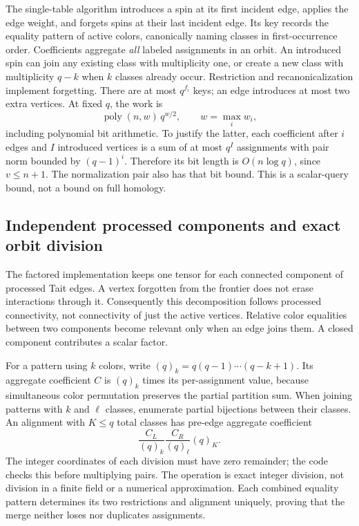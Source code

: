 The single-table algorithm introduces a spin at its first incident edge,
applies the edge weight, and forgets spins at their last incident edge.
Its key records the equality pattern of active colors, canonically naming
classes in first-occurrence order. Coefficients aggregate \emph{all} labeled
assignments in an orbit. An introduced spin can join any existing class
with multiplicity one, or create a new class with multiplicity $q-k$ when
$k$ classes already occur. Restriction and recanonicalization implement
forgetting. There are at most $q^{f_i}$ keys; an edge introduces at most
two extra vertices. At fixed $q$, the work is
\[
 \operatorname{poly}(n,w)\,q^{w/2},\qquad w=\max_i w_i,
\]
including polynomial bit arithmetic. To justify the latter, each coefficient
after $i$ edges and $I$ introduced vertices is a sum of at most $q^I$
assignments with pair norm bounded by $(q-1)^i$. Therefore its bit length
is $O(n\log q)$, since $v\le n+1$. The normalization pair also has that
bit bound. This is a scalar-query bound, not a bound on full homology.

\subsection{Independent processed components and exact orbit division}
The factored implementation keeps one tensor for each connected component
of processed Tait edges. A vertex forgotten from the frontier does not
erase interactions through it. Consequently this decomposition follows
processed connectivity, not connectivity of just the active vertices.
Relative color equalities between two components become relevant only when
an edge joins them. A closed component contributes a scalar factor.

For a pattern using $k$ colors, write $(q)_k=q(q-1)\cdots(q-k+1)$.
Its aggregate coefficient $C$ is $(q)_k$ times its per-assignment value,
because simultaneous color permutation preserves the partial partition sum.
When joining patterns with $k$ and $\ell$ classes, enumerate partial
bijections between their classes. An alignment with $K\le q$ total classes
has pre-edge aggregate coefficient
\begin{equation}\label{eq:potts-orbit-merge}
 \frac{C_L}{(q)_k}\frac{C_R}{(q)_\ell}(q)_K.
\end{equation}
The integer coordinates of each division must have zero remainder; the code
checks this before multiplying pairs. The operation is exact integer
division, not division in a finite field or a numerical approximation.
Each combined equality pattern determines its two restrictions and alignment
uniquely, proving that the merge neither loses nor duplicates assignments.


